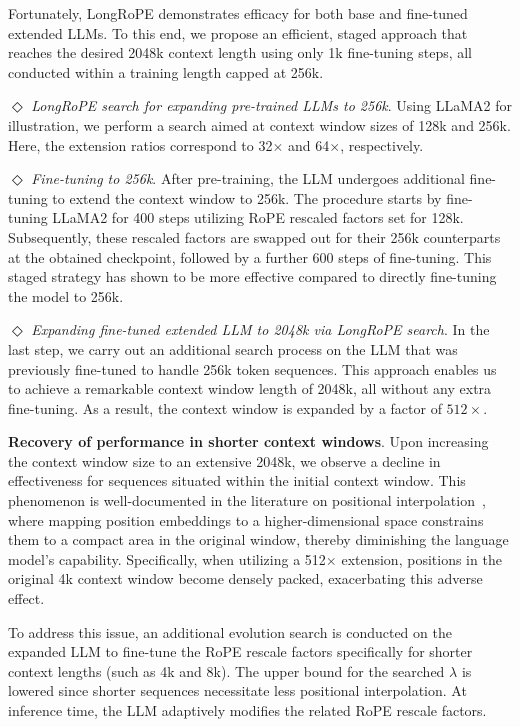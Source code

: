 Fortunately, LongRoPE demonstrates efficacy for both base and fine-tuned extended LLMs. To this end, we propose an efficient, staged approach that reaches the desired 2048k context length using only 1k fine-tuning steps, all conducted within a training length capped at 256k.

$\Diamond$ \textit{LongRoPE search for expanding pre-trained LLMs to 256k}. Using LLaMA2 for illustration, we perform a search aimed at context window sizes of 128k and 256k. Here, the extension ratios correspond to 32$\times$ and 64$\times$, respectively.

$\Diamond$ \textit{Fine-tuning to 256k}. After pre-training, the LLM undergoes additional fine-tuning to extend the context window to 256k. The procedure starts by fine-tuning LLaMA2 for 400 steps utilizing RoPE rescaled factors set for 128k. Subsequently, these rescaled factors are swapped out for their 256k counterparts at the obtained checkpoint, followed by a further 600 steps of fine-tuning. This staged strategy has shown to be more effective compared to directly fine-tuning the model to 256k.

$\Diamond$ \textit{Expanding fine-tuned extended LLM to 2048k via LongRoPE search}. In the last step, we carry out an additional search process on the LLM that was previously fine-tuned to handle 256k token sequences. This approach enables us to achieve a remarkable context window length of 2048k, all without any extra fine-tuning. As a result, the context window is expanded by a factor of $512\times$.

\textbf{Recovery of performance in shorter context windows}. Upon increasing the context window size to an extensive 2048k, we observe a decline in effectiveness for sequences situated within the initial context window. This phenomenon is well-documented in the literature on positional interpolation~\cite{pi}, where mapping position embeddings to a higher-dimensional space constrains them to a compact area in the original window, thereby diminishing the language model’s capability. Specifically, when utilizing a 512$\times$ extension, positions in the original 4k context window become densely packed, exacerbating this adverse effect.

To address this issue, an additional evolution search is conducted on the expanded LLM to fine-tune the RoPE rescale factors specifically for shorter context lengths (such as 4k and 8k). The upper bound for the searched $\lambda$ is lowered since shorter sequences necessitate less positional interpolation. At inference time, the LLM adaptively modifies the related RoPE rescale factors.

